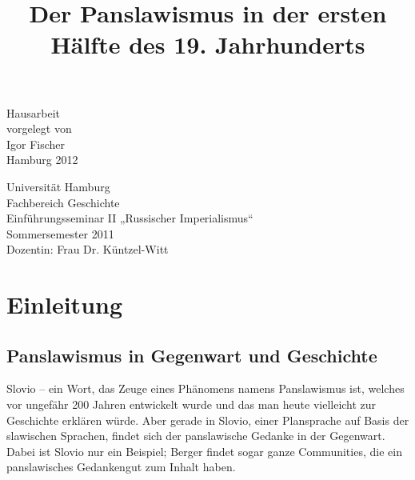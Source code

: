 \documentclass[12pt,headsepline,a4paper]{scrartcl}
\title{}
\author{}
\begin{document}
\begin{titlepage}
\date{}

\title{\Large Der Panslawismus in der ersten Hälfte des 19.
Jahrhunderts}
{\let\newpage\relax\maketitle}

\begin{center}
\vfill
Hausarbeit\\
vorgelegt von\\
Igor Fischer \\
\null
Hamburg 2012
\vfill
\end{center}

\begin{minipage}{0.5\textwidth}
\begin{flushleft} 
Universität Hamburg\\
Fachbereich Geschichte\\
Einführungsseminar II „Russischer Imperialismus“\\
Sommersemester 2011\\
Dozentin: Frau Dr. Küntzel-Witt\\

\end{flushleft}
\end{minipage}
\vline
\begin{minipage}{0.5\textwidth}
\end{minipage}

\end{titlepage}

\tableofcontents
\thispagestyle{empty}
\newpage


\section*{Einleitung}
\subsection*{Panslawismus in Gegenwart und Geschichte}
Slovio – ein Wort, das Zeuge eines Phänomens namens Panslawismus ist, welches vor
ungefähr 200 Jahren entwickelt wurde und das man heute vielleicht zur Geschichte erklären
würde. Aber gerade in Slovio, einer Plansprache auf Basis der slawischen Sprachen, findet
sich der panslawische Gedanke in der Gegenwart. Dabei ist Slovio nur ein Beispiel; Berger\autocite{berger} findet sogar ganze Communities, die ein panslawisches Gedankengut zum Inhalt
haben.
\end{document}
